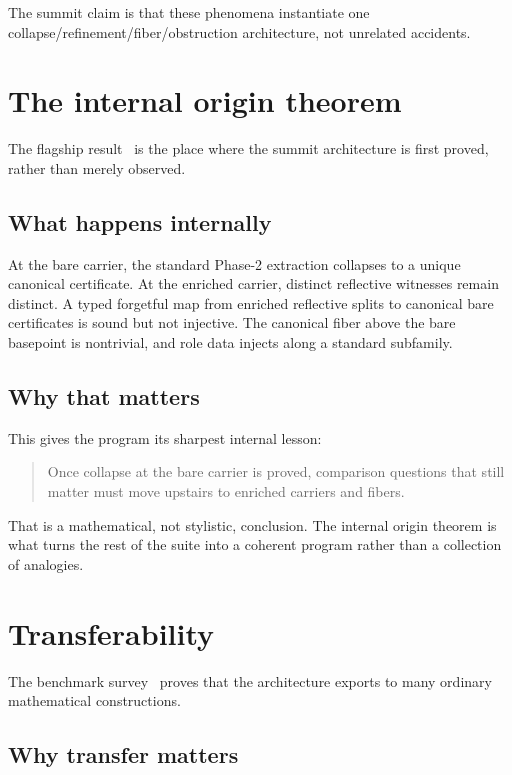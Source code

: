 \documentclass[11pt]{article}
\begin{document}
The summit claim is that these phenomena instantiate one
collapse/refinement/fiber/obstruction architecture, not unrelated accidents.

\section{The internal origin theorem}\label{sec:internal-origin}

The flagship result~\cite{SpivackIC} is the place where the summit architecture is
first proved, rather than merely observed.

\subsection{What happens internally}

At the bare carrier, the standard Phase-2 extraction collapses to a unique canonical
certificate. At the enriched carrier, distinct reflective witnesses remain distinct.
A typed forgetful map from enriched reflective splits to canonical bare certificates
is sound but not injective. The canonical fiber above the bare basepoint is
nontrivial, and role data injects along a standard subfamily.

\subsection{Why that matters}

This gives the program its sharpest internal lesson:

\begin{quote}
Once collapse at the bare carrier is proved, comparison questions that still matter
must move upstairs to enriched carriers and fibers.
\end{quote}

That is a mathematical, not stylistic, conclusion. The internal origin theorem is
what turns the rest of the suite into a coherent program rather than a collection
of analogies.

\section{Transferability}\label{sec:transferability}

The benchmark survey~\cite{SpivackValidation} proves that the architecture exports
to many ordinary mathematical constructions.

\subsection{Why transfer matters}
\end{document}
